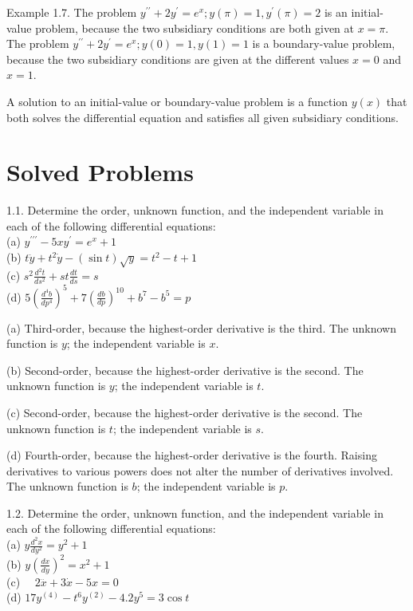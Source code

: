 \documentclass[10pt]{article}
\begin{document}
Example 1.7. The problem $y^{\prime \prime}+2 y^{\prime}=e^{x} ; y(\pi)=1, y^{\prime}(\pi)=2$ is an initial-value problem, because the two subsidiary conditions are both given at $x=\pi$. The problem $y^{\prime \prime}+2 y^{\prime}=e^{x} ; y(0)=1, y(1)=1$ is a boundary-value problem, because the two subsidiary conditions are given at the different values $x=0$ and $x=1$.

A solution to an initial-value or boundary-value problem is a function $y(x)$ that both solves the differential equation and satisfies all given subsidiary conditions.

\section*{Solved Problems}
1.1. Determine the order, unknown function, and the independent variable in each of the following differential equations:\\
(a) $y^{\prime \prime \prime}-5 x y^{\prime}=e^{x}+1$\\
(b) $t \ddot{y}+t^{2} \dot{y}-(\sin t) \sqrt{y}=t^{2}-t+1$\\
(c) $s^{2} \frac{d^{2} t}{d s^{2}}+s t \frac{d t}{d s}=s$\\
(d) $5\left(\frac{d^{4} b}{d p^{4}}\right)^{5}+7\left(\frac{d b}{d p}\right)^{10}+b^{7}-b^{5}=p$

(a) Third-order, because the highest-order derivative is the third. The unknown function is $y$; the independent variable is $x$.

(b) Second-order, because the highest-order derivative is the second. The unknown function is $y$; the independent variable is $t$.

(c) Second-order, because the highest-order derivative is the second. The unknown function is $t$; the independent variable is $s$.

(d) Fourth-order, because the highest-order derivative is the fourth. Raising derivatives to various powers does not alter the number of derivatives involved. The unknown function is $b$; the independent variable is $p$.

1.2. Determine the order, unknown function, and the independent variable in each of the following differential equations:\\
(a) $y \frac{d^{2} x}{d y^{2}}=y^{2}+1$\\
(b) $y\left(\frac{d x}{d y}\right)^{2}=x^{2}+1$\\
(c) $\quad 2 \dddot{x}+3 \dot{x}-5 x=0$\\
(d) $17 y^{(4)}-t^{6} y^{(2)}-4.2 y^{5}=3 \cos t$
\end{document}

